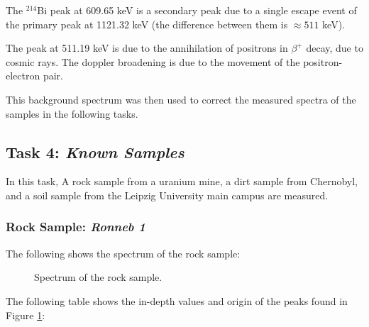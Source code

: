 \documentclass{article}
\begin{document}
The $^{214}$Bi peak at 609.65 keV is a secondary peak due to a single escape event of the primary peak at 1121.32 keV (the difference between them is $\approx 511$ keV).

The peak at 511.19 keV is due to the annihilation of positrons in $\beta^+$ decay, due to cosmic rays. The doppler broadening is due to the movement of the positron-electron pair.

This background spectrum was then used to correct the measured spectra of the samples in the following tasks.

\pagebreak{}

\subsection{Task 4: \textit{Known Samples}}

In this task, A rock sample from a uranium mine, a dirt sample from Chernobyl, and a soil sample from the Leipzig University main campus are measured.

\subsubsection{Rock Sample: \textit{Ronneb 1}}

The following shows the spectrum of the rock sample:

\begin{figure}[h!]
	\centering
	\scalebox{1}{}
	\caption{Spectrum of the rock sample.}
	\label{fig:Rock}
\end{figure}

The following table shows the in-depth values and origin of the peaks found in Figure \ref{fig:Rock}:
\end{document}
